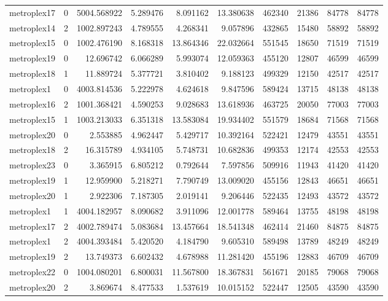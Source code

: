 \begin{longtable}{|l|r|r|r|r|r|r|r|r|r|}
metroplex17 & 0 & 5004.568922 & 5.289476 & 8.091162 & 13.380638 & 462340 & 21386 & 84778 & 84778 \\
metroplex14 & 2 & 1002.897243 & 4.789555 & 4.268341 & 9.057896 & 432865 & 15480 & 58892 & 58892 \\
metroplex15 & 0 & 1002.476190 & 8.168318 & 13.864346 & 22.032664 & 551545 & 18650 & 71519 & 71519 \\
metroplex19 & 0 & 12.696742 & 6.066289 & 5.993074 & 12.059363 & 455120 & 12807 & 46599 & 46599 \\
metroplex18 & 1 & 11.889724 & 5.377721 & 3.810402 & 9.188123 & 499329 & 12150 & 42517 & 42517 \\
metroplex1 & 0 & 4003.814536 & 5.222978 & 4.624618 & 9.847596 & 589424 & 13715 & 48138 & 48138 \\
metroplex16 & 2 & 1001.368421 & 4.590253 & 9.028683 & 13.618936 & 463725 & 20050 & 77003 & 77003 \\
metroplex15 & 1 & 1003.213033 & 6.351318 & 13.583084 & 19.934402 & 551579 & 18684 & 71568 & 71568 \\
metroplex20 & 0 & 2.553885 & 4.962447 & 5.429717 & 10.392164 & 522421 & 12479 & 43551 & 43551 \\
metroplex18 & 2 & 16.315789 & 4.934105 & 5.748731 & 10.682836 & 499353 & 12174 & 42553 & 42553 \\
metroplex23 & 0 & 3.365915 & 6.805212 & 0.792644 & 7.597856 & 509916 & 11943 & 41420 & 41420 \\
metroplex19 & 1 & 12.959900 & 5.218271 & 7.790749 & 13.009020 & 455156 & 12843 & 46651 & 46651 \\
metroplex20 & 1 & 2.922306 & 7.187305 & 2.019141 & 9.206446 & 522435 & 12493 & 43572 & 43572 \\
metroplex1 & 1 & 4004.182957 & 8.090682 & 3.911096 & 12.001778 & 589464 & 13755 & 48198 & 48198 \\
metroplex17 & 2 & 4002.789474 & 5.083684 & 13.457664 & 18.541348 & 462414 & 21460 & 84875 & 84875 \\
metroplex1 & 2 & 4004.393484 & 5.420520 & 4.184790 & 9.605310 & 589498 & 13789 & 48249 & 48249 \\
metroplex19 & 2 & 13.749373 & 6.602432 & 4.678988 & 11.281420 & 455196 & 12883 & 46709 & 46709 \\
metroplex22 & 0 & 1004.080201 & 6.800031 & 11.567800 & 18.367831 & 561671 & 20185 & 79068 & 79068 \\
metroplex20 & 2 & 3.869674 & 8.477533 & 1.537619 & 10.015152 & 522447 & 12505 & 43590 & 43590 \\

\end{longtable}
